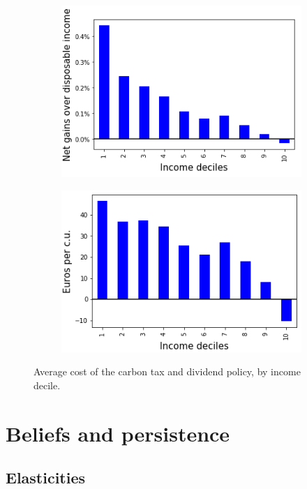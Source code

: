 \documentclass[11pt]{article}
\begin{document}
\begin{appendices}
\begin{figure}[H]
\begin{subfigure}{.5\textwidth}
\centering
\includegraphics[scale=0.9]{Images/effort_rate_uc.png}
\end{subfigure}\hfill
\begin{subfigure}{.5\textwidth}
\centering
\includegraphics[scale=0.9]{Images/average_cost_decile.png}
\end{subfigure}
\caption{Average cost of the carbon tax and dividend policy, by income decile.}
\label{figure:effort_rate_uc}
\end{figure}

\vspace{1cm}

\section{Beliefs and persistence\label{sec:app_perception}}

    \subsection{Elasticities}


\end{appendices}
\end{document}
